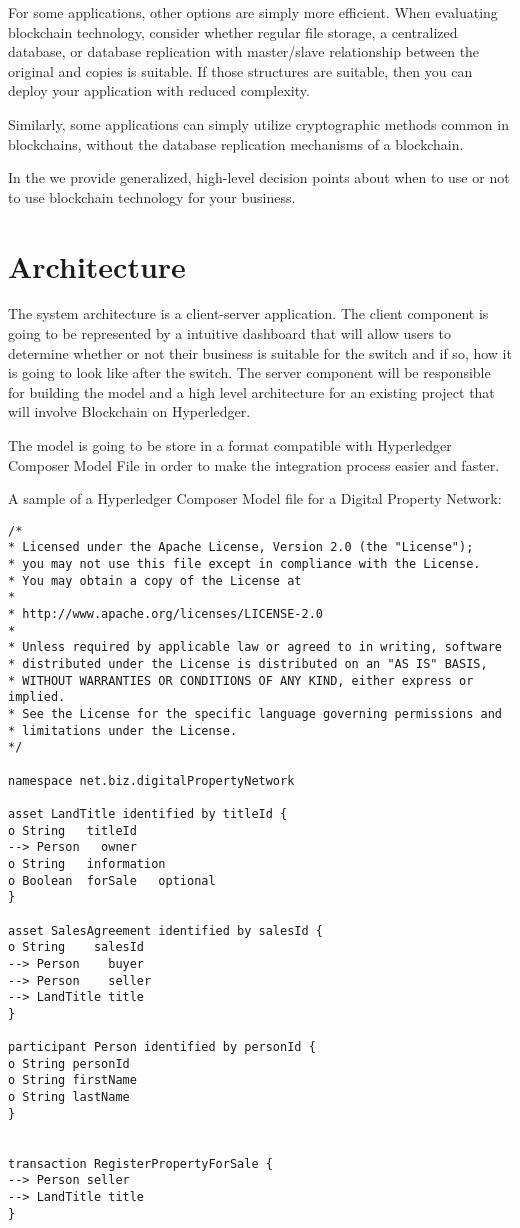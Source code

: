 For some applications, other options are simply more efficient. When evaluating blockchain technology, consider whether regular file storage, a centralized database, or database replication with master/slave relationship between the original and copies is suitable. If those structures are suitable, then you can deploy your application with reduced complexity. 

Similarly, some applications can simply utilize cryptographic methods common in blockchains, without the database replication mechanisms of a blockchain.

In the  we provide generalized, high-level decision points about when to use or not to use blockchain technology for your business.


\section{Architecture}
\label{sub-sec:chapter3-section2}
The system architecture is a client-server application. The client component is going to be represented by a intuitive dashboard that will allow users to determine whether or not their business is suitable for the switch and if so, how it is going to look like after the switch.
The server component will be responsible for building the model and a high level architecture for an existing project that will involve Blockchain on Hyperledger.

The model is going to be store in a format compatible with Hyperledger Composer Model File in order to make the integration process easier and faster.

A sample of a Hyperledger Composer Model file for a Digital Property Network:
\begin{verbatim}
/*
* Licensed under the Apache License, Version 2.0 (the "License");
* you may not use this file except in compliance with the License.
* You may obtain a copy of the License at
*
* http://www.apache.org/licenses/LICENSE-2.0
*
* Unless required by applicable law or agreed to in writing, software
* distributed under the License is distributed on an "AS IS" BASIS,
* WITHOUT WARRANTIES OR CONDITIONS OF ANY KIND, either express or implied.
* See the License for the specific language governing permissions and
* limitations under the License.
*/

namespace net.biz.digitalPropertyNetwork

asset LandTitle identified by titleId {
o String   titleId
--> Person   owner
o String   information
o Boolean  forSale   optional
}

asset SalesAgreement identified by salesId {
o String    salesId
--> Person    buyer
--> Person    seller
--> LandTitle title
}

participant Person identified by personId {
o String personId
o String firstName
o String lastName
}


transaction RegisterPropertyForSale {
--> Person seller
--> LandTitle title
}

\end{verbatim}
